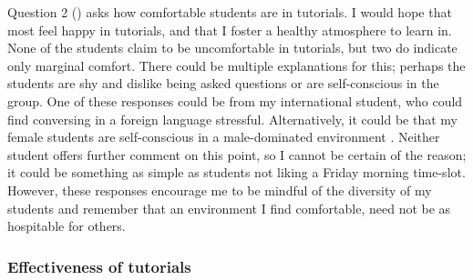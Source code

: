 Question 2 () asks how comfortable students are in tutorials. I would hope that most feel happy in tutorials, and that I foster a healthy atmosphere to learn in. None of the students claim to be uncomfortable in tutorials, but two do indicate only marginal comfort. There could be multiple explanations for this; perhaps the students are shy and dislike being asked questions or are self-conscious in the group. One of these responses could be from my international student, who could find conversing in a foreign language stressful. Alternatively, it could be that my female students are self-conscious in a male-dominated environment \citep{Gonsalves2014,Gonsalves2014a}. Neither student offers further comment on this point, so I cannot be certain of the reason; it could be something as simple as students not liking a Friday morning time-slot. However, these responses encourage me to be mindful of the diversity of my students and remember that an environment I find comfortable, need not be as hospitable for others.

\subsubsection{Effectiveness of tutorials}\label{sec:tutorial-effect}

